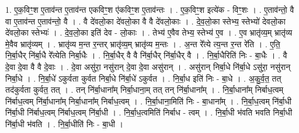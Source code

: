 \documentclass[17pt]{extarticle}
\begin{document}
1. ए॒क॒विꣳ॒॒श ए॒ताव॑न्त ए॒ताव॑न्त एकविꣳ॒॒श ए॑कविꣳ॒॒श ए॒ताव॑न्तः । . ए॒क॒विꣳ॒॒श इत्ये॑क - विꣳ॒॒शः । . ए॒ताव॑न्तो॒ वै वा ए॒ताव॑न्त ए॒ताव॑न्तो॒ वै । . वै दे॑वलो॒का दे॑वलो॒का वै वै दे॑वलो॒काः । . दे॒व॒लो॒का स्तेभ्य॒ स्तेभ्यो॑ देवलो॒का दे॑वलो॒का स्तेभ्यः॑ । . दे॒व॒लो॒का इति॑ देव - लो॒काः । . तेभ्य॑ ए॒वैव तेभ्य॒ स्तेभ्य॑ ए॒व । . ए॒व भ्रातृ॑व्य॒म् भ्रातृ॑व्य मे॒वैव भ्रातृ॑व्यम् । . भ्रातृ॑व्य म॒न्त र॒न्तर् भ्रातृ॑व्य॒म् भ्रातृ॑व्य म॒न्तः । . अ॒न्त रे᳚त्ये त्य॒न्त र॒न्त रे॑ति । . ए॒ति॒ नि॒र्बा॒धैर् नि॑र्बा॒धै रे᳚त्येति निर्बा॒धैः । . नि॒र्बा॒धैर् वै वै नि॑र्बा॒धैर् नि॑र्बा॒धैर् वै । . नि॒र्बा॒धैरिति॑ निः - बा॒धैः । . वै दे॒वा दे॒वा वै वै दे॒वाः । . दे॒वा असु॑रा॒ नसु॑रान् दे॒वा दे॒वा असु॑रान् । . असु॑रान् निर्बा॒धे नि॑र्बा॒धे ऽसु॑रा॒ नसु॑रान् निर्बा॒धे । . नि॒र्बा॒धे॑ ऽकुर्वता कुर्वत निर्बा॒धे नि॑र्बा॒धे॑ ऽकुर्वत । . नि॒र्बा॒ध इति॑ निः - बा॒धे । . अ॒कु॒र्व॒त॒ तत् तद॑कुर्वता कुर्वत॒ तत् । . तन् नि॑र्बा॒धाना᳚म् निर्बा॒धाना॒म् तत् तन् नि॑र्बा॒धाना᳚म् । . नि॒र्बा॒धाना᳚म् निर्बाध॒त्वम् नि॑र्बाध॒त्वम् नि॑र्बा॒धाना᳚म् निर्बा॒धाना᳚म् निर्बाध॒त्वम् । . नि॒र्बा॒धाना॒मिति॑ निः - बा॒धाना᳚म् । . नि॒र्बा॒ध॒त्वम् नि॑र्बा॒धी नि॑र्बा॒धी नि॑र्बाध॒त्वम् नि॑र्बाध॒त्वम् नि॑र्बा॒धी । . नि॒र्बा॒ध॒त्वमिति॑ निर्बाध - त्वम् । . नि॒र्बा॒धी भ॑वति भवति निर्बा॒धी नि॑र्बा॒धी भ॑वति । . नि॒र्बा॒धीति॑ निः - बा॒धी । \newline
\end{document}
